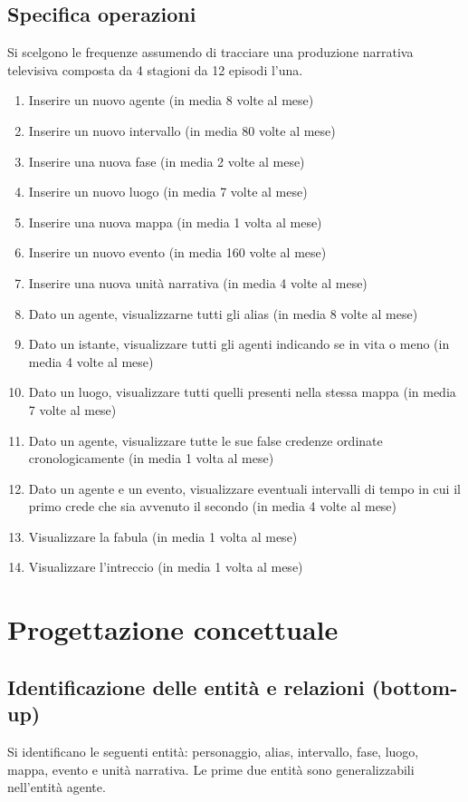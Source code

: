 \documentclass{article}
\begin{document}
\subsection{Specifica operazioni}
Si scelgono le frequenze assumendo di tracciare una produzione narrativa
televisiva composta da 4 stagioni da 12 episodi l'una.
\begin{enumerate}
	\item Inserire un nuovo agente (in media 8 volte al mese)
	\item Inserire un nuovo intervallo (in media 80 volte al mese)
	\item Inserire una nuova fase (in media 2 volte al mese)
	\item Inserire un nuovo luogo (in media 7 volte al mese)
	\item Inserire una nuova mappa (in media 1 volta al mese)
	\item Inserire un nuovo evento (in media 160 volte al mese)
	\item Inserire una nuova unità narrativa (in media 4 volte al mese)
	\item Dato un agente, visualizzarne tutti gli alias (in media 8 volte al
	      mese)
	\item Dato un istante, visualizzare tutti gli agenti indicando se in vita o
	      meno (in media 4 volte al mese)
	\item Dato un luogo, visualizzare tutti quelli presenti nella stessa mappa (in
	      media 7 volte al mese)
	\item Dato un agente, visualizzare tutte le sue false credenze ordinate
	      cronologicamente (in media 1 volta al mese)
	\item Dato un agente e un evento, visualizzare eventuali intervalli di
	      tempo in cui il primo crede che sia avvenuto il secondo (in media 4
	      volte al mese)
	\item Visualizzare la fabula (in media 1 volta al mese)
	\item Visualizzare l'intreccio (in media 1 volta al mese)
\end{enumerate}


\section{Progettazione concettuale}

\subsection{Identificazione delle entità e relazioni (bottom-up)}
Si identificano le seguenti entità: personaggio, alias, intervallo,
fase, luogo, mappa, evento e unità narrativa.
Le prime due entità sono generalizzabili nell'entità agente.
\end{document}
